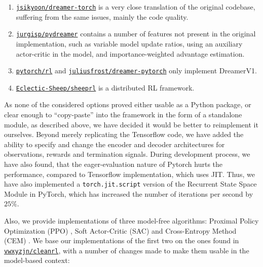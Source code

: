 \documentclass[en]{pracamgr}
\begin{document}
\begin{enumerate}
  \item \href{https://github.com/jsikyoon/dreamer-torch}{\tt jsikyoon/dreamer-torch} is a very close translation of the original codebase, suffering from the same issues, mainly the code quality.
  \item \href{https://github.com/jurgisp/pydreamer}{\tt jurgisp/pydreamer} contains a number of features not present in the original implementation, such as variable model update ratios, using an auxiliary actor-critic in the model, and importance-weighted advantage estimation.
  \item \href{https://github.com/pytorch/rl}{\tt pytorch/rl} and \href{https://github.com/juliusfrost/dreamer-pytorch}{\tt juliusfrost/dreamer-pytorch} only implement DreamerV1.
  \item \href{https://github.com/Eclectic-Sheep/sheeprl}{\tt Eclectic-Sheep/sheeprl} is a distributed RL framework.
\end{enumerate}

As none of the considered options proved either usable as a Python package, or clear enough to ``copy-paste'' into the framework in the form of a standalone module, as described above, we have decided it would be better to reimplement it ourselves. Beyond merely replicating the Tensorflow code, we have added the ability to specify and change the encoder and decoder architectures for observations, rewards and termination signals. During development process, we have also found, that the eager-evaluation nature of Pytorch hurts the performance, compared to Tensorflow implementation, which uses JIT. Thus, we have also implemented a {\tt torch.jit.script} version of the Recurrent State Space Module in PyTorch, which has increased the number of iterations per second by $25 \%$.

Also, we provide implementations of three model-free algorithms: Proximal Policy Optimization (PPO) \autocite{schulmanProximalPolicyOptimization2017}, Soft Actor-Critic (SAC) \autocite{haarnojaSoftActorCriticOffPolicy2018} and Cross-Entropy Method (CEM) \autocite{deboerTutorialCrossEntropyMethod2005}. We base our implementations of the first two on the ones found in \href{https://github.com/vwxyzjn/cleanrl}{\tt vwxyzjn/cleanrl}, with a number of changes made to make them usable in the model-based context:
\end{document}
